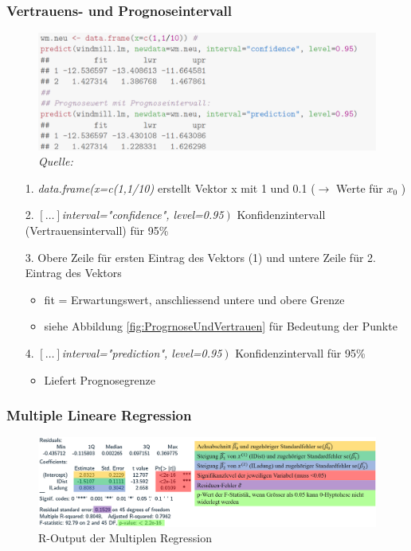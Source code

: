 \subsubsection{Vertrauens- und Prognoseintervall}
\label{subsubsec:VertrauensUndPrognoseintervall}
\begin{figure}[!h]
	\includegraphics[width=0.5\linewidth]{./figures/Rprediction}
	\caption{\textit{Quelle:} \cite{C:Prediction}}
	\label{fig:rprediction}
\end{figure}

\begin{itemize}
	\item [1.]\textit{data.frame(x=c(1,1/10)} erstellt Vektor x mit 1 und 0.1 ($\rightarrow$ Werte für $x_0$ )
	\item [2.]\textit{$\left[\ldots\right]$interval="confidence", level=0.95$\left.\right)$} Konfidenzintervall (Vertrauensintervall) für 95\%
	\item [3.]Obere Zeile für ersten Eintrag des Vektors (1) und untere Zeile für 2. Eintrag des Vektors
	\begin{itemize}
		\item fit = Erwartungswert, anschliessend untere und obere Grenze
		\item siehe Abbildung \ref{fig:ProgrnoseUndVertrauen} für Bedeutung der Punkte
	\end{itemize}
	\item [4.]\textit{$\left[\ldots\right]$interval="prediction", level=0.95$\left.\right)$} Konfidenzintervall für 95\%
	\begin{itemize}
		\item Liefert Prognosegrenze
	\end{itemize}
\end{itemize}

\subsubsection{Multiple Lineare Regression}
\label{subsubsec:MultipleLineareRegressionR}
\begin{figure}[!h]
	\centering
	\includegraphics[width=1\linewidth]{figures/MultiReg1}
	\caption{R-Output der Multiplen Regression}
	\label{fig:multireg1}
\end{figure}


